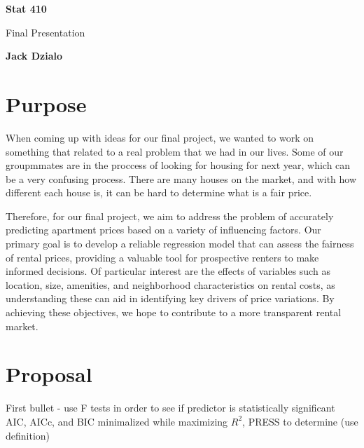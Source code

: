 \documentclass[a4paper,10pt]{article}
\begin{document}
    \begin{titlepage}
    \begin{center}
        \vspace*{3cm}

        \Huge
        \textbf{Stat 410}

        \vspace{0.5cm}
        \LARGE
        Final Presentation

        \vspace{1.5cm}

        \textbf{Jack Dzialo}

        \vfill

    \end{center}
\end{titlepage}

\section*{Purpose}

When coming up with ideas for our final project, we wanted to work on something that related to a real problem that we had in our lives. Some of our groupmmates are in the proccess of looking for housing for next year, which can be a very confusing process. There are many houses on the market, and with how different each house is, it can be hard to determine what is a fair price.

Therefore, for our final project, we aim to address the problem of accurately predicting apartment prices based on a variety of influencing factors. Our primary goal is to develop a reliable regression model that can assess the fairness of rental prices, providing a valuable tool for prospective renters to make informed decisions. Of particular interest are the effects of variables such as location, size, amenities, and neighborhood characteristics on rental costs, as understanding these can aid in identifying key drivers of price variations. By achieving these objectives, we hope to contribute to a more transparent rental market.

\section*{Proposal}

First bullet - use F tests in order to see if predictor is statistically significant\\
AIC, AICc, and BIC minimalized while maximizing $R^2$, PRESS to determine (use definition)
\end{document}
